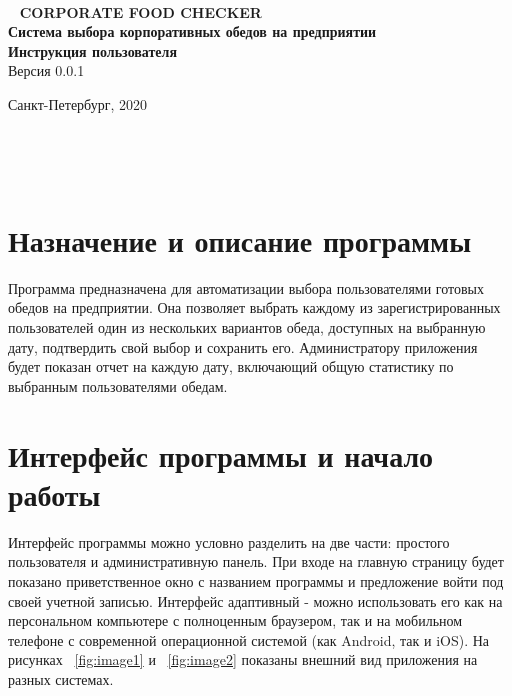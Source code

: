 \documentclass[a4paper]{article}
\begin{document}
\def\figurename{Рисунок}

\makeatletter
\lst@UserCommand{}
\makeatother
 
\begin{center}
 \hfill \break
\hfill\break
\hfill\break
\hfill \break
\hfill \break
\hfill \break
\hfill \break
\hfill \break
\hfill \break
\large{\textbf{CORPORATE FOOD CHECKER}}\\
\hfill \break
\hfill \break
\large{\textbf{Система выбора корпоративных обедов на предприятии}}\\
\large{\textbf{Инструкция пользователя}}\\
\hfill \break
\hfill \break
Версия 0.0.1\\
\hfill \break
\hfill \break
\hfill \break
\hfill \break
\hfill \break
\hfill \break
\hfill \break
\hfill \break
\hfill \break
\hfill \break
\hfill \break
\hfill \break
\hfill \break
\begin{center} Санкт-Петербург, 2020 \end{center}
\end{center}
\thispagestyle{empty}
 
 
\newpage 
    \tableofcontents %
\newpage

\section{Назначение и описание программы}

Программа предназначена для автоматизации выбора пользователями готовых обедов на предприятии. Она позволяет выбрать каждому из зарегистрированных пользователей один из нескольких вариантов обеда, доступных на выбранную дату, подтвердить свой выбор и сохранить его. Администратору приложения будет показан отчет на каждую дату, включающий общую статистику по выбранным пользователями обедам.

\section{Интерфейс программы и начало работы}

Интерфейс программы можно условно разделить на две части: простого пользователя и административную панель. При входе на главную страницу будет показано приветственное окно с названием программы и предложение войти под своей учетной записью. Интерфейс адаптивный - можно использовать его как на персональном компьютере с полноценным браузером, так и на мобильном телефоне с современной операционной системой (как Android, так и iOS). На рисунках ~\ref{fig:image1} и ~\ref{fig:image2} показаны внешний вид приложения на разных системах.
\end{document}
